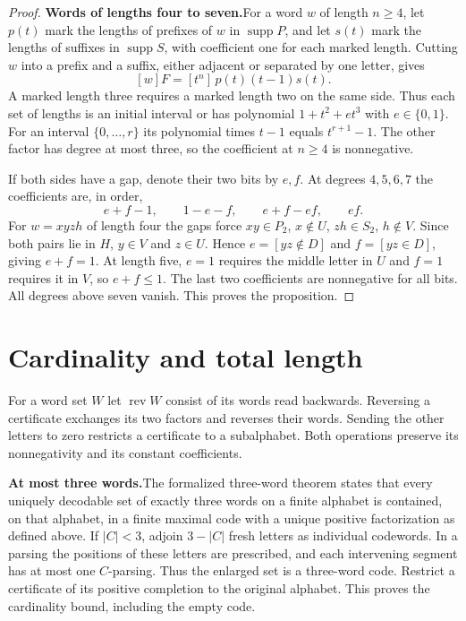 \documentclass[11pt,a4paper]{article}
\newcommand{\head}[1]{\par\noindent\textbf{#1}\enspace}
\DeclareMathOperator{\rev}{rev}
\begin{document}
\begin{proof}
\head{Words of lengths four to seven.}For a word $w$ of length $n\ge4$, let $p(t)$ mark the lengths
of prefixes of $w$ in $\operatorname{supp}P$, and let $s(t)$ mark the lengths of suffixes in
$\operatorname{supp}S$, with coefficient one for each marked length. Cutting $w$ into a prefix and
a suffix, either adjacent or separated by one letter, gives
\[
  [w]F=[t^n]\,p(t)(t-1)s(t).
\]
A marked length three requires a marked length two on the same side. Thus each set of lengths is
an initial interval or has polynomial $1+t^2+et^3$ with $e\in\{0,1\}$. For an interval
$\{0,\dots,r\}$ its polynomial times $t-1$ equals $t^{r+1}-1$. The other factor has degree at most
three, so the coefficient at $n\ge4$ is nonnegative.

If both sides have a gap, denote their two bits by $e,f$. At degrees $4,5,6,7$ the coefficients
are, in order,
\[
  e+f-1,\qquad 1-e-f,\qquad e+f-ef,\qquad ef.
\]
For $w=xyzh$ of length four the gaps force $xy\in P_2$, $x\notin U$, $zh\in S_2$, $h\notin V$.
Since both pairs lie in $H$, $y\in V$ and $z\in U$. Hence $e=[yz\notin D]$ and $f=[yz\in D]$,
giving $e+f=1$. At length five, $e=1$ requires the middle letter in $U$ and $f=1$ requires it in
$V$, so $e+f\le1$. The last two coefficients are nonnegative for all bits. All degrees above seven
vanish. This proves the proposition.
\end{proof}

\section{Cardinality and total length}

For a word set $W$ let $\rev W$ consist of its words read backwards. Reversing a certificate
exchanges its two factors and reverses their words. Sending the other letters to zero restricts a
certificate to a subalphabet. Both operations preserve its nonnegativity and its constant
coefficients.

\head{At most three words.}The formalized three-word theorem \cite{ThreeWord} states that every
uniquely decodable set of exactly three words on a finite alphabet is contained, on that alphabet,
in a finite maximal code with a unique positive factorization as defined above. If $|C|<3$, adjoin
$3-|C|$ fresh letters as individual codewords. In a parsing the positions of these letters are
prescribed, and each intervening segment has at most one $C$-parsing. Thus the enlarged set is a
three-word code. Restrict a certificate of its positive completion to the original alphabet. This
proves the cardinality bound, including the empty code.
\end{document}
